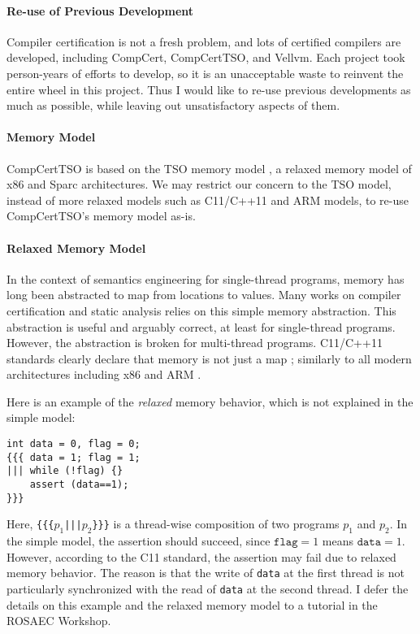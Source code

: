 \documentclass[nocopyrightspace]{sigplanconf}
\begin{document}
\paragraph{Re-use of Previous Development}
Compiler certification is not a fresh problem, and lots of certified
compilers are developed, including CompCert, CompCertTSO, and Vellvm.
Each project took person-years of efforts to develop, so it is an
unacceptable waste to reinvent the entire wheel in this project.  Thus
I would like to re-use previous developments as much as possible,
while leaving out unsatisfactory aspects of them.

\paragraph{Memory Model}
CompCertTSO is based on the TSO memory model
\cite{Sewell:2010:XRU:1785414.1785443}, a relaxed memory model of x86
and Sparc architectures.  We may restrict our concern to the TSO
model, instead of more relaxed models such as C11/C++11 and ARM
models, to re-use CompCertTSO's memory model as-is.

\paragraph{Relaxed Memory Model}\label{sec:relaxed}
In the context of semantics engineering for single-thread programs,
memory has long been abstracted to map from locations to values.  Many
works on compiler certification and static analysis relies on this
simple memory abstraction.  This abstraction is useful and arguably
correct, at least for single-thread programs.  However, the
abstraction is broken for multi-thread programs.  C11/C++11 standards
clearly declare that memory is not just a map
\cite{Batty:2011:MCC:1926385.1926394}; similarly to all modern
architectures including x86 \cite{Sewell:2010:XRU:1785414.1785443} and
ARM \cite{Sarkar:2011:UPM:1993498.1993520}.

Here is an example of the \emph{relaxed} memory behavior, which is not
explained in the simple model:
\begin{verbatim}
int data = 0, flag = 0;
{{{ data = 1; flag = 1;
||| while (!flag) {}
    assert (data==1);
}}}
\end{verbatim}
Here, \texttt{\{\{\{$p_1$|||$p_2$\}\}\}} is a thread-wise composition
of two programs $p_1$ and $p_2$.  In the simple model, the assertion
should succeed, since $\texttt{flag}=1$ means $\texttt{data}=1$.
However, according to the C11 standard, the assertion may fail due to
relaxed memory behavior.  The reason is that the write of
\texttt{data} at the first thread is not particularly synchronized
with the read of \texttt{data} at the second thread.  I defer the
details on this example and the relaxed memory model to a tutorial in
the ROSAEC Workshop.
\end{document}
